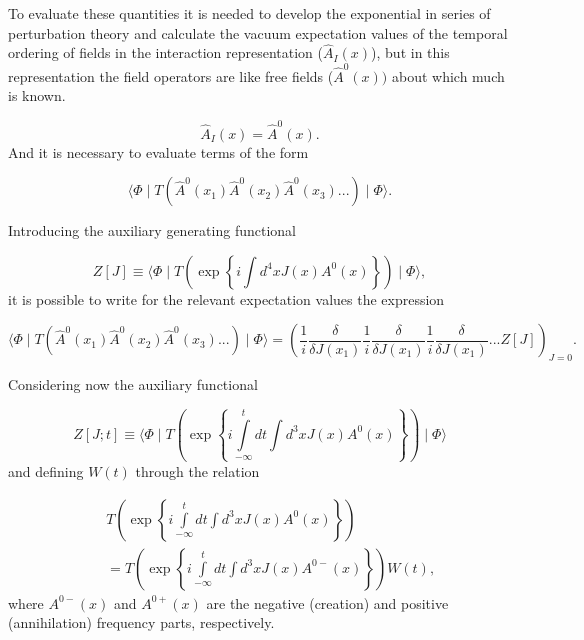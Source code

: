 \documentclass[12pt,letterpaper]{report}
\begin{document}
To evaluate these quantities it is needed to develop the
exponential in series of perturbation theory and calculate the
vacuum expectation values of the temporal ordering of fields in
the interaction representation ($ \hat{A}_I\left(x\right) $), but
in this representation the field operators are like free fields
($\hat{A}^0\left(x\right))$ about which much is known.

\[
\hat{A}_I\left(x\right) =\hat{A}^0\left(x\right).
\]
And it is necessary to evaluate terms of the form

\begin{equation}
\langle \Phi \mid T\left(\hat{A}^0\left(x_1\right) \hat{A}^0\left(
x_2\right) \hat{A}^0\left(x_3\right)...\right) \mid \Phi \rangle.
\end{equation}

Introducing the auxiliary generating functional

\begin{equation}
Z\left[ J\right] \equiv \langle \Phi \mid T\left(\exp \left\{
i\int d^4xJ\left(x\right) A^0\left(x\right) \right\} \right) \mid
\Phi \rangle, \label{genfun}
\end{equation}
it is possible to write for the relevant expectation values the
expression

\begin{equation}
\langle \Phi \mid T\left(\hat{A}^0\left(x_1\right) \hat{A}^0\left(
x_2\right) \hat{A}^0\left(x_3\right)...\right) \mid \Phi \rangle
=\left(\frac 1i\frac \delta {\delta J\left(x_1\right) }\frac
1i\frac \delta {\delta J\left(x_1\right) }\frac 1i\frac \delta
{\delta J\left(x_1\right) }...Z\left[ J\right] \right) _{J=0}.
\end{equation}

Considering now the auxiliary functional

\begin{equation}
Z\left[ J;t\right]\equiv \langle \Phi \mid T\left(\exp \left\{
i\int\limits_{-\infty }^tdt\int d^3xJ\left(x\right) A^0\left(
x\right) \right\} \right) \mid \Phi \rangle
\end{equation}
and defining $W\left(t\right)$ through the relation

\begin{eqnarray}
&&T\left(\exp \left\{ i\int\limits_{-\infty }^tdt\int d^3xJ\left(
x\right) A^0\left(x\right) \right\} \right)\nonumber \\ &&
=T\left(\exp \left\{ i\int\limits_{-\infty }^tdt\int d^3xJ\left(
x\right) A^{0-}\left(x\right) \right\} \right) W\left(t\right),
\label{T11}
\end{eqnarray}
where $A^{0-}\left(x\right)$ and \thinspace $A^{0+}\left(
x\right)$ are the negative (creation) and positive (annihilation)
frequency parts, respectively.
\end{document}
